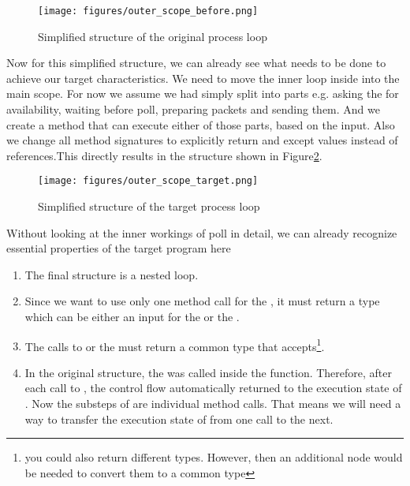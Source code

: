 \begin{figure}[H]
    \centering
    \texttt{[image: figures/outer\_scope\_before.png]}
    \caption{Simplified structure of the original process loop}
    \label{fig:mainLoopOriginal}
\end{figure}

Now for this simplified structure, we can already see what needs to be done to achieve our target characteristics. We need to move the inner loop inside  into the main scope.
For now we assume we had simply split  into parts e.g. asking the  for availability, waiting before poll, preparing packets and sending them. And we create a method  that can execute either of those parts, based on the input. Also we change all method signatures to explicitly return and except values instead of references.This directly results in the structure shown in Figure\ref{fig:mainLoopTarget}. 

\begin{figure}[H]
    \centering
    \texttt{[image: figures/outer\_scope\_target.png]}
    \caption{Simplified structure of the target process loop}
    \label{fig:mainLoopTarget}
\end{figure}

Without looking at the inner workings of poll in detail, we can already recognize essential properties of the target program here

\begin{enumerate}
    \item The final structure is a nested loop.
    \item Since we want to use only one method call for the , it must return a type which can be either an input for the  or the .
    \item The calls to  or the  must return a common type that  accepts\footnote{you could also return different types. However, then an additional node would be needed to convert them to a common type}.
    \item In the original structure, the  was called inside the  function. Therefore, after each call to , the control flow automatically returned to the execution state of . Now the substeps of  are individual method calls. That means we will need a way to transfer the execution state of  from one call to the next. 
\end{enumerate}

